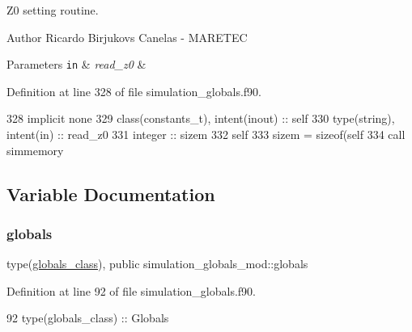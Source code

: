 Z0 setting routine. 

\begin{DoxyAuthor}{Author}
Ricardo Birjukovs Canelas -\/ M\+A\+R\+E\+T\+EC
\end{DoxyAuthor}

\begin{DoxyParams}[1]{Parameters}
\mbox{\tt in}  & {\em read\+\_\+z0} & \\
\hline
\end{DoxyParams}


Definition at line 328 of file simulation\+\_\+globals.\+f90.


\begin{DoxyCode}
328     \textcolor{keywordtype}{implicit none}
329     \textcolor{keywordtype}{class}(constants\_t), \textcolor{keywordtype}{intent(inout)} :: self
330     \textcolor{keywordtype}{type}(string), \textcolor{keywordtype}{intent(in)} :: read\_z0
331     \textcolor{keywordtype}{integer} :: sizem
332     self%
333     sizem = sizeof(self%
334     \textcolor{keyword}{call }simmemory%
\end{DoxyCode}


\subsection{Variable Documentation}
\mbox{\label{namespacesimulation__globals__mod_a04123075b6de525703edb89697fc39e9}} 
\subsubsection{\texorpdfstring{globals}{globals}}
{\footnotesize\ttfamily type(\mbox{\hyperlink{structsimulation__globals__mod_1_1globals__class}{globals\+\_\+class}}), public simulation\+\_\+globals\+\_\+mod\+::globals}



Definition at line 92 of file simulation\+\_\+globals.\+f90.


\begin{DoxyCode}
92     \textcolor{keywordtype}{type}(globals\_class) :: Globals
\end{DoxyCode}
